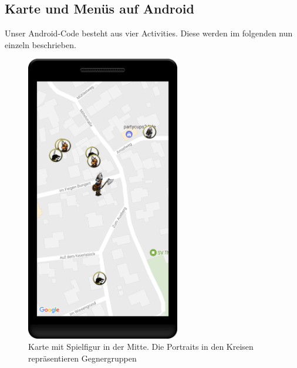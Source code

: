 \documentclass[extern,palatino]{cgBA}
\begin{document}
\subsection{Karte und Menüs auf Android}
Unser Android-Code besteht aus vier Activities. Diese werden im folgenden nun einzeln beschrieben.
\begin{figure}[H] 
		\centering
		\includegraphics[width=0.6\textwidth]{map.png}
		\caption{Karte mit Spielfigur in der Mitte. Die Portraits in den Kreisen repräsentieren Gegnergruppen}
		\label{map}
\end{figure}
\end{document}
